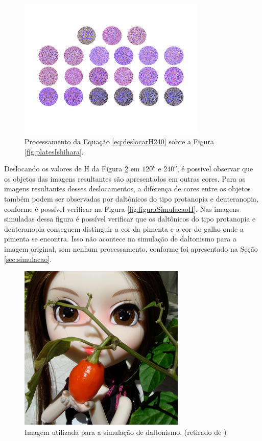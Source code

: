 \documentclass[	12pt, Times, openright, twoside, a4paper, english, brazil]{abntex2}
\begin{document}
\begin{figure}[!htb]
\centering \includegraphics[width=0.80\textwidth]{figuraDeslocar240.jpg}
\caption{Processamento da Equação \ref{eq:deslocarH240} sobre a Figura \ref{fig:platesIshihara}. \label{fig:deslocamento240}}
\end{figure}

Deslocando os valores de H da Figura \ref{fig:figuraPimentaOriginal} em $120^o$ e $240^o$, é possível observar que os objetos das imagens resultantes são apresentados em outras cores. Para as imagens resultantes desses deslocamentos, a diferença de cores entre os objetos também podem ser observadas por daltônicos do tipo protanopia e deuteranopia, conforme é possível verificar na Figura  \ref{fig:figuraSimulacaoH}. Nas imagens simuladas dessa figura é possível verificar que os daltônicos do tipo protanopia e deuteranopia conseguem distinguir a cor da pimenta e a cor do galho onde a pimenta se encontra. Isso não acontece na simulação de daltonismo para a imagem original, sem nenhum processamento, conforme foi apresentado na Seção \ref{sec:simulacao}.

\begin{figure}[!htb]
\centering \includegraphics[width=0.4\linewidth]{figuraSimuladorOriginal.png}
\caption{Imagem utilizada para a simulação de daltonismo. (retirado de  )}
\label{fig:figuraPimentaOriginal}
\end{figure}
\end{document}

